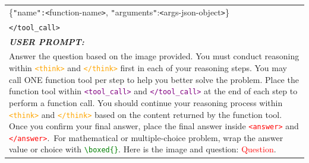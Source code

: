 \documentclass[11pt]{article}
\begin{document}
\begin{table}[htbp]
{\begin{tabular}{p{13cm}}
        \{\texttt{"}name\texttt{":<}function-name\texttt{>}, \texttt{"}arguments\texttt{"}:\texttt{<}args-json-object\texttt{>}\} \\
        \texttt{</tool\_call>} \\
        \midrule
        \textbf{\textit{USER PROMPT:}} \\
        Answer the question based on the image provided. You must conduct reasoning within \textcolor{orange}{\texttt{<think>}} and \textcolor{orange}{\texttt{</think>}} first in each of your reasoning steps. You may call ONE function tool per step to help you better solve the problem. Place the function tool within \textcolor{purple}{\texttt{<tool\_call>}} and \textcolor{purple}{\texttt{</tool\_call>}} at the end of each step to perform a function call. You should continue your reasoning process within \textcolor{orange}{\texttt{<think>}} and \textcolor{orange}{\texttt{</think>}} based on the content returned by the function tool. Once you confirm your final answer, place the final answer inside \textcolor{red}{\texttt{<answer>}} and \textcolor{red}{\texttt{</answer>}}.\ For mathematical or multiple-choice problem, wrap the answer value or choice with \textcolor{green}{\texttt{\textbackslash boxed\{\}}}. Here is the image and question: \textcolor{red}{Question}.\\
        \bottomrule
\end{tabular}
}
\end{table}
\end{document}
